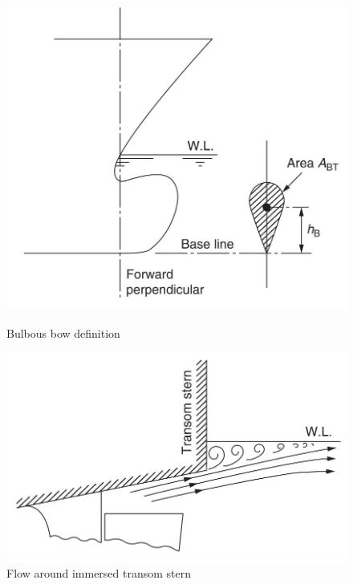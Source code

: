 \begin{figure}[ht]
    \centering
    \begin{minipage}[b]{0.45\linewidth}
        \includegraphics[width=\linewidth]{02_figures/Molland11_bulb.jpg}
        \caption{Bulbous bow definition }
        \label{fig:molland11_bow}
    \end{minipage}
    \hfill
    \begin{minipage}[b]{0.45\linewidth}
        \includegraphics[width=\linewidth]{02_figures/molland11_transom.jpg}
        \caption{Flow around immersed transom stern }
        \label{fig:molland1_transom}
    \end{minipage}
\end{figure}

